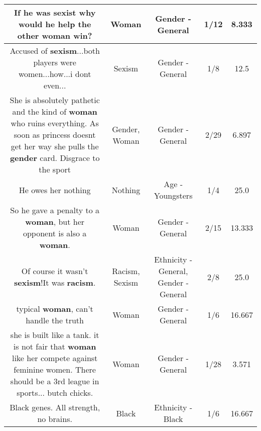 \documentclass[11pt]{article}
\newlength\mylength
\begin{document}
\begin{center}
\begin{longtable}{|C{.65\mylength}|C{.30\mylength}|C{.12\mylength}|C{.12\mylength}|C{.12\mylength}|}
  \small If he was sexist why would he help the other \textbf{woman} win?\normalsize   & Woman & Gender - General & 1/12 & 8.333 \\  \hline
  \small Accused of \textbf{sexism}...both players were women...how...i dont even...\normalsize   & Sexism & Gender - General & 1/8 & 12.5 \\  \hline
  \small She is absolutely pathetic and the kind of \textbf{woman} who ruins everything. As soon as princess doesnt get her way she pulls the \textbf{gender} card. Disgrace to the sport\normalsize   & Gender, Woman & Gender - General & 2/29 & 6.897 \\  \hline
  \small He owes her nothing\normalsize   & Nothing & Age - Youngsters & 1/4 & 25.0 \\  \hline
  \small So he gave a penalty to a \textbf{woman}, but her opponent is also a \textbf{woman}.\normalsize   & Woman & Gender - General & 2/15 & 13.333 \\  \hline
  \small Of course it wasn't \textbf{sexism}!It was \textbf{racism}.\normalsize   & Racism, Sexism & Ethnicity - General, Gender - General & 2/8 & 25.0 \\  \hline
  \small typical \textbf{woman}, can't handle the truth\normalsize   & Woman & Gender - General & 1/6 & 16.667 \\  \hline
  \small she is built like a tank.  it is not fair that \textbf{woman} like her compete against feminine women.  There should be a 3rd league in sports... butch chicks.\normalsize   & Woman & Gender - General & 1/28 & 3.571 \\  \hline
  \small Black genes.  All strength, no brains.\normalsize   & Black & Ethnicity - Black & 1/6 & 16.667 \\  \hline

\end{longtable}
\end{center}
\end{document}
